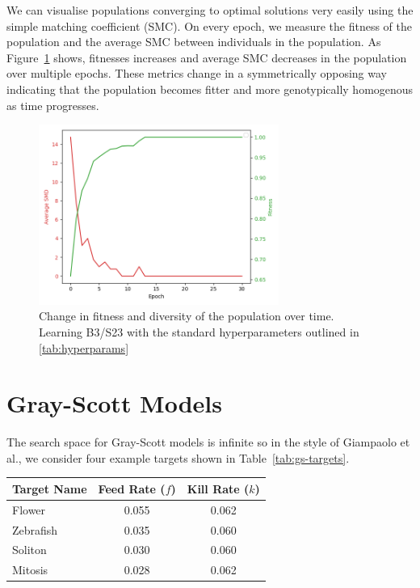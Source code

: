 We can visualise populations converging to optimal solutions very easily using the simple matching coefficient (SMC). On every epoch, we measure the fitness of the population and the average SMC between individuals in the population. As Figure~\ref{fig:smd} shows, fitnesses increases and average SMC decreases in the population over multiple epochs. These metrics change in a symmetrically opposing way indicating that the population becomes fitter and more genotypically homogenous as time progresses.

\begin{figure}[!h]
\centering
\includegraphics[width=0.7\textwidth]{images/smd.png}
\caption{Change in fitness and diversity of the population over time. Learning B3/S23 with the standard hyperparameters outlined in \ref{tab:hyperparams}}
\label{fig:smd}
\end{figure}

\section{Gray-Scott Models}

The search space for Gray-Scott models is infinite so in the style of Giampaolo et al.\cite{giampaolo2022physics}, we consider four example targets shown in Table~\ref{tab:gs-targets}.

\begin{center}
    \begin{tabular}{ |l|c|c| } \label{tab:gs-targets}
        \hline
        Target Name & Feed Rate ($f$) & Kill Rate ($k$)\\
        \hline
        Flower & 0.055 & 0.062\\
        Zebrafish & 0.035 & 0.060\\
        Soliton & 0.030 & 0.060\\
        Mitosis & 0.028 & 0.062\\
        \hline
    \end{tabular}
\end{center}

